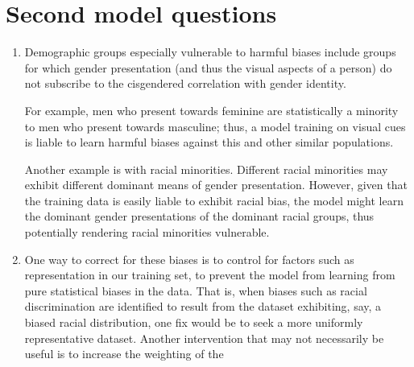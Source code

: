 \documentclass[11pt]{article}
\begin{document}
\section{Second model questions}

\begin{enumerate}[label={(\upshape\alph*)}]

    \item Demographic groups especially vulnerable to harmful biases include groups for which gender presentation (and thus the visual aspects of a person) do not subscribe to the cisgendered correlation with gender identity.
    
    For example, men who present towards feminine are statistically a minority to men who present towards masculine; thus, a model training on visual cues is liable to learn harmful biases against this and other similar populations.
    
    Another example is with racial minorities. Different racial minorities may exhibit different dominant means of gender presentation. However, given that the training data is easily liable to exhibit racial bias, the model might learn the dominant gender presentations of the dominant racial groups, thus potentially rendering racial minorities vulnerable.
    
    \item One way to correct for these biases is to control for factors such as representation in our training set, to prevent the model from learning from pure statistical biases in the data. That is, when biases such as racial discrimination are identified to result from the dataset exhibiting, say, a biased racial distribution, one fix would be to seek a more uniformly representative dataset. Another intervention that may not necessarily be useful is to increase the weighting of the 
    
\end{enumerate}
\end{document}
